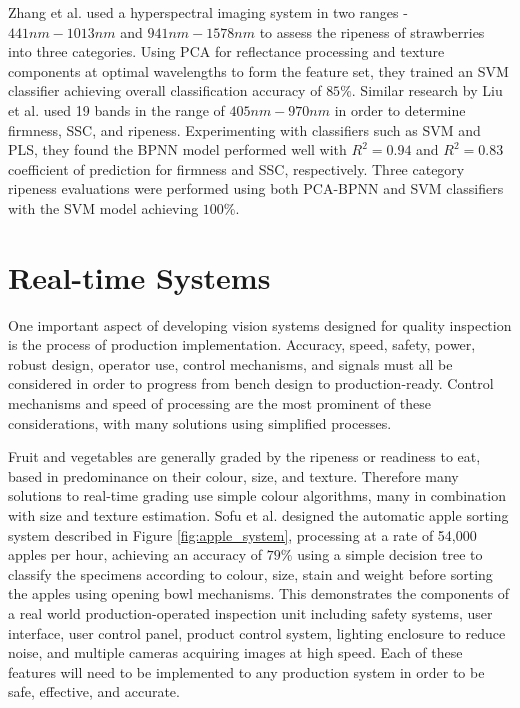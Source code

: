 \documentclass[fleqn,twoside,12pt]{report}
\begin{document}
Zhang et al.\cite{zhang} used a hyperspectral imaging system in two ranges - $441nm-1013nm$ and $941nm-1578nm$ to assess the ripeness of strawberries into three categories. Using PCA for reflectance processing and texture components at optimal wavelengths to form the feature set, they trained an SVM classifier achieving overall classification accuracy of $85\%$. Similar research by Liu et al.\cite{liu} used 19 bands in the range of $405nm-970nm$ in order to determine firmness, SSC, and ripeness. Experimenting with classifiers such as SVM and PLS, they found the BPNN model performed well with $R^2=0.94$ and $R^2=0.83$ coefficient of prediction for firmness and SSC, respectively. Three category ripeness evaluations were performed using both PCA-BPNN and SVM classifiers with the SVM model achieving $100\%$.

 




\section{Real-time Systems}

One important aspect of developing vision systems designed for quality inspection is the process of production implementation. Accuracy, speed, safety, power, robust design, operator use, control mechanisms, and signals must all be considered in order to progress from bench design to production-ready. Control mechanisms and speed of processing are the most prominent of these considerations, with many solutions using simplified processes.

Fruit and vegetables are generally graded by the ripeness or readiness to eat, based in predominance on their colour, size, and texture. Therefore many solutions to real-time grading use simple colour algorithms, many in combination with size and texture estimation. Sofu et al.\cite{sofu} designed the automatic apple sorting system described in Figure \ref{fig:apple_system}, processing at a rate of 54,000 apples per hour, achieving an accuracy of $79\%$ using a simple decision tree to classify the specimens according to colour, size, stain and weight before sorting the apples using opening bowl mechanisms. This demonstrates the components of a real world production-operated inspection unit including safety systems, user interface, user control panel, product control system, lighting enclosure to reduce noise, and multiple cameras acquiring images at high speed. Each of these features will need to be implemented to any production system in order to be safe, effective, and accurate.
\end{document}
